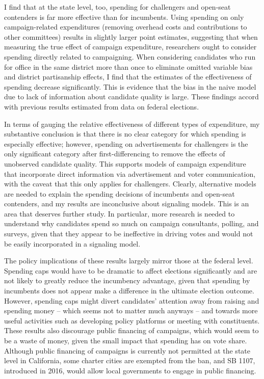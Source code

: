 \documentclass{article}
\begin{document}
I find that at the state level, too, spending for challengers and open-seat contenders is far more effective than for incumbents. Using spending on only campaign-related expenditures (removing overhead costs and contributions to other committees) results in slightly larger point estimates, suggesting that when measuring the true effect of campaign expenditure, researchers ought to consider spending directly related to campaigning. When considering candidates who run for office in the same district more than once to eliminate omitted variable bias and district partisanship effects, I find that the estimates of the effectiveness of spending decrease significantly. This is evidence that the bias in the naive model due to lack of information about candidate quality is large. These findings accord with previous results estimated from data on federal elections.

In terms of gauging the relative effectiveness of different types of expenditure, my substantive conclusion is that there is no clear category for which spending is especially effective; however, spending on advertisements for challengers is the only significant category after first-differencing to remove the effects of unobserved candidate quality. This supports models of campaign expenditure that incorporate direct information via advertisement and voter communication, with the caveat that this only applies for challengers. Clearly, alternative models are needed to explain the spending decisions of incumbents and open-seat contenders, and my results are inconclusive about signaling models. This is an area that deserves further study. In particular, more research is needed to understand why candidates spend so much on campaign consultants, polling, and surveys, given that they appear to be ineffective in driving votes and would not be easily incorporated in a signaling model.

The policy implications of these results largely mirror those at the federal level. Spending caps would have to be dramatic to affect elections significantly and are not likely to greatly reduce the incumbency advantage, given that spending by incumbents does not appear make a difference in the ultimate election outcome. However, spending caps might divert candidates' attention away from raising and spending money -- which seems not to matter much anyways -- and towards more useful activities such as developing policy platforms or meeting with constituents. These results also discourage public financing of campaigns, which would seem to be a waste of money, given the small impact that spending has on vote share. Although public financing of campaigns is currently not permitted at the state level in California, some charter cities are exempted from the ban, and SB 1107, introduced in 2016, would allow local governments to engage in public financing.
\end{document}
